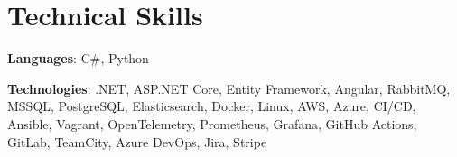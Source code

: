 \documentclass[letterpaper,11pt]{article}
\begin{document}
%
\section{Technical Skills}
\resumeSubHeadingListStart
\item{
            \textbf{Languages}{: C\#, Python}
      }
\item{
            \textbf{Technologies}{: .NET, ASP.NET Core, Entity Framework, Angular, RabbitMQ, MSSQL, PostgreSQL, Elasticsearch, Docker, Linux, AWS, Azure, CI/CD, Ansible, Vagrant, OpenTelemetry, Prometheus, Grafana, GitHub Actions, GitLab, TeamCity, Azure DevOps, Jira, Stripe}
      }
\resumeSubHeadingListEnd


\end{document}
